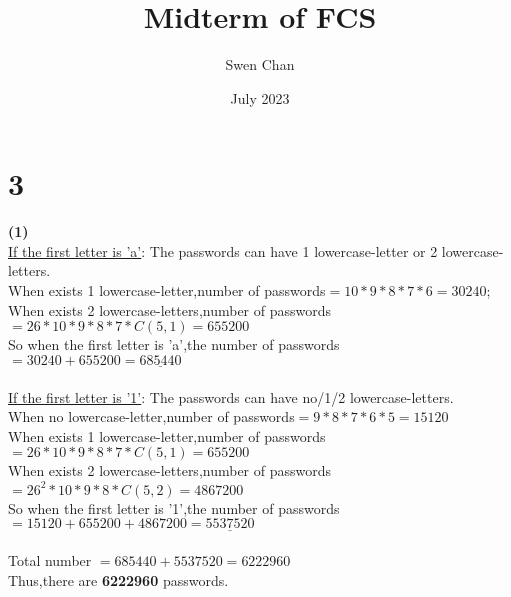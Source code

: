 \documentclass{article}
\title{Midterm of FCS}
\author{Swen Chan}
\date{July 2023}
\begin{document}
\maketitle

\section*{3}
\textbf{(1)}\\
\underline{If the first letter is 'a'}:
The passwords can have 1 lowercase-letter or 2 lowercase-letters.\\
When exists 1 lowercase-letter,number of passwords\(=10*9*8*7*6=30240\);\\
When exists 2 lowercase-letters,number of passwords\(=26*10*9*8*7*C(5,1)=655200\)\\
So when the first letter is 'a',the number of passwords\(=30240+655200=\underline{685440}\)\\\\
\underline{If the first letter is '1'}:
The passwords can have no/1/2 lowercase-letters.\\
When no lowercase-letter,number of passwords\(=9*8*7*6*5=15120\)\\
When exists 1 lowercase-letter,number of passwords\(=26*10*9*8*7*C(5,1)=655200\)\\
When exists 2 lowercase-letters,number of passwords\(=26^2*10*9*8*C(5,2)=4867200\)\\
So when the first letter is '1',the number of passwords\(=15120+655200+4867200=\underline{5537520}\)\\\\
Total number \(=685440+5537520=6222960\)\\
Thus,there are \textbf{6222960} passwords.
\end{document}
